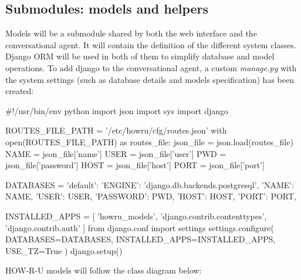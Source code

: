 \documentclass[12pt,english]{article}
\begin{document}
\subsection{Submodules: models and helpers}

Models will be a submodule shared by both the web interface and the conversational agent. It will contain the definition of the different system classes. Django ORM will be used in both of them to simplify database and model operations. To add django to the conversational agent, a custom \emph{manage.py} with the system settings (such as database details and models specification) has been created:

  \begin{python}[caption={Custom \emph{manage.py} file to use Django ORM in the agent. Based in \href{https://stackoverflow.com/questions/45595750/use-django-orm-outside-of-django}{https://stackoverflow.com/questions/45595750/use-django-orm-outside-of-django}}, captionpos=b]
  #!/usr/bin/env python
  import json
  import sys
  import django

  ROUTES_FILE_PATH = '/etc/howru/cfg/routes.json'
  with open(ROUTES_FILE_PATH) as routes_file:
    json_file = json.load(routes_file)
    NAME = json_file['name']
    USER = json_file['user']
    PWD = json_file['password']
    HOST = json_file['host']
    PORT = json_file['port']

  DATABASES = {
    'default': {
        'ENGINE': 'django.db.backends.postgresql',
        'NAME': NAME,
        'USER': USER,
        'PASSWORD': PWD,
        'HOST': HOST,
        'PORT': PORT,
    }
  }

  INSTALLED_APPS = [
    'howru_models',
    'django.contrib.contenttypes',
    'django.contrib.auth'
  ]
  from django.conf import settings
  settings.configure(
    DATABASES=DATABASES,
    INSTALLED_APPS=INSTALLED_APPS,
    USE_TZ=True
  )
  django.setup()

  \end{python}

HOW-R-U models will follow the class diagram below:
\end{document}
